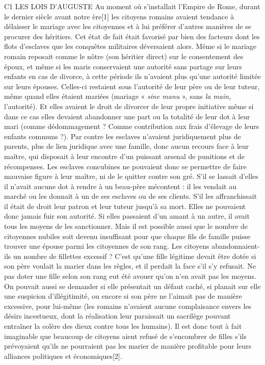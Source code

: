 C1 LES LOIS D'AUGUSTE
 Au moment où s'installait l'Empire de Rome, durant le dernier siècle avant notre ère[1] les citoyens romains avaient tendance à délaisser le mariage avec les citoyennes et à lui préférer d'autres manières de se procurer des héritiers. Cet état de fait était favorisé par bien des facteurs dont les flots d'esclaves que les conquêtes militaires déversaient alors. 
 Même si le mariage romain reposait comme le nôtre (son héritier direct) sur le consentement des époux, et même si les maris conservaient une autorité sans partage sur leurs enfants en cas de divorce, à cette période ils n'avaient plus qu'une autorité limitée sur leurs épouses. Celles-ci restaient sous l'autorité de leur père ou de leur tuteur, même quand elles étaient mariées (mariage « \emph{sine manu} », sans \emph{la main}, l'autorité). Et elles avaient le droit de divorcer de leur propre initiative même si dans ce cas elles devaient abandonner une part ou la totalité de leur dot à leur mari (comme dédommagement ? Comme contribution aux frais d'élevage de leurs enfants communs ?). 
 Par contre les esclaves n'avaient juridiquement plus de parents, plus de lien juridique avec une famille, donc aucun recours face à leur maître, qui disposait à leur encontre d'un puissant arsenal de punitions et de récompenses. Les esclaves concubines ne pouvaient donc se permettre de faire mauvaise figure à leur maître, ni de le quitter contre son gré. S'il se lassait d'elles il n'avait aucune dot à rendre à un beau-père mécontent : il les vendait au marché ou les donnait à un de ses esclaves ou de ses clients. S'il les affranchissait il était de droit leur patron et leur tuteur jusqu'à sa mort. Elles ne pouvaient donc jamais fuir son autorité. Si elles passaient d'un amant à un autre, il avait tous les moyens de les sanctionner.
 Mais il est possible aussi que le nombre de citoyennes nubiles soit devenu insuffisant pour que chaque fils de famille puisse trouver une épouse parmi les citoyennes de son rang. Les citoyens abandonnaient-ils un nombre de fillettes excessif ? C'est qu'une fille légitime devait être dotée si son père voulait la marier dans les règles, et il perdait la face s'il s'y refusait. Ne pas doter une fille selon son rang eut été avouer qu'on n'en avait pas les moyens. On pouvait aussi se demander si elle présentait un défaut caché, si planait sur elle une suspicion d'illégitimité, ou encore si son père ne l'aimait pas de manière excessive, pour lui-même (les romains n'avaient aucune complaisance envers les désirs incestueux, dont la réalisation leur paraissait un sacrilège pouvant entraîner la colère des dieux contre tous les humains). Il est donc tout à fait imaginable que beaucoup de citoyens aient refusé de s'encombrer de filles s'ils prévoyaient qu'ils ne pourraient pas les marier de manière profitable pour leurs alliances politiques et économiques[2]. 
